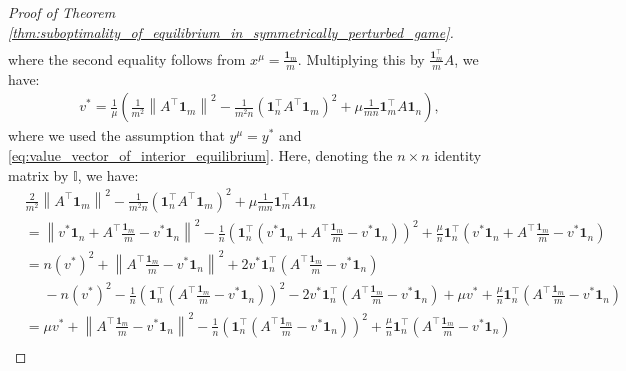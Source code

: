 \documentclass[10pt,a4paper]{amsart}
\newcommand{\bone}{\mathbf{1}}
\begin{document}
\begin{proof}[Proof of Theorem \ref{thm:suboptimality_of_equilibrium_in_symmetrically_perturbed_game}]
\begin{align*}
    \end{align*}
    where the second equality follows from $x^{\mu} = \frac{\bone_m}{m}$.
    Multiplying this by $\frac{\bone_m^{\top}}{m}A$, we have:
    \begin{align}
        v^{\ast} = \frac{1}{\mu}\left(\frac{1}{m^2}\left\|A^{\top}\bone_m\right\|^2 - \frac{1}{m^2n}(\bone_n^{\top}A^{\top}\bone_m)^2  + \mu\frac{1}{m n}\bone_m^{\top}A\bone_n\right),
        \label{eq:game_value_equivalence}
    \end{align}
    where we used the assumption that $y^{\mu} = y^{\ast}$ and \eqref{eq:value_vector_of_interior_equilibrium}.
    Here, denoting the $n\times n$ identity matrix by $\mathbb{I}$, we have:
    \begin{align}
        & \frac{2}{m^2}\left\|A^{\top}\bone_m\right\|^2 - \frac{1}{m^2n}(\bone_n^{\top}A^{\top}\bone_m)^2  + \mu\frac{1}{m n}\bone_m^{\top}A\bone_n \nonumber                                                                                                                                                                             \\
        & = \left\|v^{\ast}\bone_n + A^{\top}\frac{\bone_m}{m} - v^{\ast}\bone_n\right\|^2 - \frac{1}{n}\left(\bone_n^{\top}\left(v^{\ast}\bone_n + A^{\top}\frac{\bone_m}{m} - v^{\ast}\bone_n\right)\right)^2 + \frac{\mu}{n}\bone_n^{\top}\left(v^{\ast}\bone_n + A^{\top}\frac{\bone_m}{m} - v^{\ast}\bone_n\right) \nonumber         \\
        & = n (v^{\ast})^2 + \left\|A^{\top}\frac{\bone_m}{m} - v^{\ast}\bone_n\right\|^2 + 2v^{\ast}\bone_n^{\top}\left(A^{\top}\frac{\bone_m}{m} - v^{\ast}\bone_n\right) \nonumber                                                                                                                                                     \\
        & \phantom{=} - n(v^{\ast})^2 - \frac{1}{n}\left(\bone_n^{\top}\left(A^{\top}\frac{\bone_m}{m} - v^{\ast}\bone_n\right)\right)^2 - 2v^{\ast}\bone_n^{\top}\left(A^{\top}\frac{\bone_m}{m} - v^{\ast}\bone_n\right) + \mu v^{\ast} + \frac{\mu}{n}\bone_n^{\top}\left(A^{\top}\frac{\bone_m}{m} - v^{\ast}\bone_n\right) \nonumber \\
        & = \mu v^{\ast} + \left\|A^{\top}\frac{\bone_m}{m} - v^{\ast}\bone_n\right\|^2 - \frac{1}{n}\left(\bone_n^{\top}\left(A^{\top}\frac{\bone_m}{m} - v^{\ast}\bone_n\right)\right)^2 + \frac{\mu}{n}\bone_n^{\top}\left(A^{\top}\frac{\bone_m}{m} - v^{\ast}\bone_n\right) \nonumber                                                \\

\end{align}
\end{proof}
\end{document}
